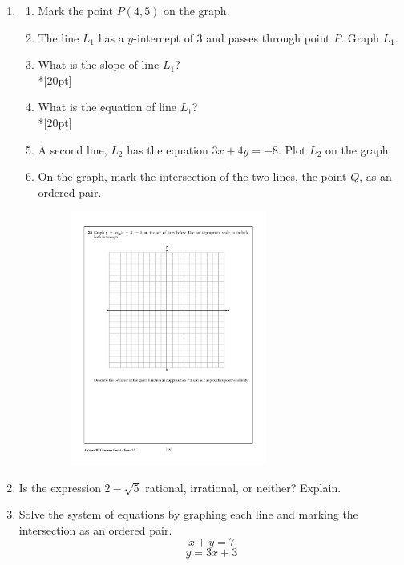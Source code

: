 \documentclass[]{book}
\begin{document}
\begin{enumerate}
\newpage
\item  
\begin{enumerate}
    \item Mark the point $P(4, 5)$ on the graph.
    \item The line $L_1$ has a $y$-intercept of 3 and passes through point $P$. Graph $L_1$.
    \item What is the slope of line $L_1$?\\*[20pt]
    \item What is the equation of line $L_1$?\\*[20pt]
    \item A second line, $L_2$ has the equation $3x+4y=-8$. Plot $L_2$ on the graph.
    \item On the graph, mark the intersection of the two lines, the point $Q$, as an ordered pair.

\begin{figure}[!ht]
    \centering
    \includegraphics[width=0.65\textwidth]{regents-grid.pdf}
\end{figure}
\end{enumerate}

\item Is the expression $2-\sqrt{5}$ rational, irrational, or neither? Explain.

\newpage
\item Solve the system of equations by graphing each line and marking the intersection as an ordered pair.
\[x+y=7\]
\[y=3x+3\]


\end{enumerate}
\end{document}
